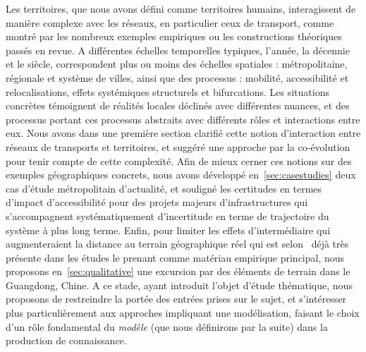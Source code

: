 Les territoires, que nous avons défini comme territoires humains, interagissent de manière complexe avec les réseaux, en particulier ceux de transport, comme montré par les nombreux exemples empiriques ou les constructions théoriques passés en revue. A différentes échelles temporelles typiques, l'année, la décennie et le siècle, correspondent plus ou moins des échelles spatiales : métropolitaine, régionale et système de villes, ainsi que des processus : mobilité, accessibilité et relocalisations, effets systémiques structurels et bifurcations. Les situations concrètes témoignent de réalités locales déclinés avec différentes nuances, et des processus portant ces processus abstraits avec différents rôles et interactions entre eux. Nous avons dans une première section clarifié cette notion d'interaction entre réseaux de transports et territoires, et suggéré une approche par la co-évolution pour tenir compte de cette complexité. Afin de mieux cerner ces notions sur des exemples géographiques concrets, nous avons développé en~\ref{sec:casestudies} deux cas d'étude métropolitain d'actualité, et souligné les certitudes en termes d'impact d'accessibilité pour des projets majeurs d'infrastructures qui s'accompagnent systématiquement d'incertitude en terme de trajectoire du système à plus long terme. Enfin, pour limiter les effets d'intermédiaire qui augmenteraient la distance au terrain géographique réel qui est selon~\cite{lefort2012terrain} déjà très présente dans les études le prenant comme matériau empirique principal, nous proposons en~\ref{sec:qualitative} une excursion par des éléments de terrain dans le Guangdong, Chine. A ce stade, ayant introduit l'objet d'étude thématique, nous proposons de restreindre la portée des entrées prises sur le sujet, et s'intéresser plus particulièrement aux approches impliquant une modélisation, faisant le choix d'un rôle fondamental du \emph{modèle} (que nous définirons par la suite) dans la production de connaissance.





\stars






